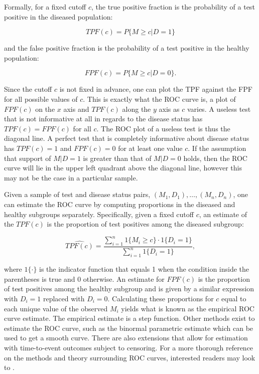 \documentclass[codesnippet]{jss}
\begin{document}
Formally, for a fixed cutoff \(c\), the true positive fraction is the
probability of a test positive in the diseased population:

\[ TPF(c) = P\{ M \geq c | D = 1 \} \]

and the false positive fraction is the probability of a test positive in
the healthy population:

\[ FPF(c) = P\{ M \geq c | D = 0 \}. \]

Since the cutoff \(c\) is not fixed in advance, one can plot the TPF
against the FPF for all possible values of \(c\). This is exactly what
the ROC curve is, a plot of \(FPF(c)\) on the \(x\) axis and \(TPF(c)\)
along the \(y\) axis as \(c\) varies. A useless test that is not
informative at all in regards to the disease status has
\(TPF(c) = FPF(c)\) for all \(c\). The ROC plot of a useless test is
thus the diagonal line. A perfect test that is completely informative
about disease status has \(TPF(c) = 1\) and \(FPF(c) = 0\) for at least
one value \(c\). If the assumption that support of \(M | D = 1\) is
greater than that of \(M | D = 0\) holds, then the ROC curve will lie in
the upper left quadrant above the diagonal line, however this may not be
the case in a particular sample.

Given a sample of test and disease status pairs,
\((M_1, D_1), \ldots, (M_n, D_n)\), one can estimate the ROC curve by
computing proportions in the diseased and healthy subgroups separately.
Specifically, given a fixed cutoff \(c\), an estimate of the \(TPF(c)\)
is the proportion of test positives among the diseased subgroup:

\[ \widehat{TPF(c)} = \frac{\sum_{i = 1}^n 1\{M_i \geq c\} \cdot 1\{D_i = 1\}}{\sum_{i=1}^n 1\{D_i = 1\}}, \]

where \(1\{\cdot\}\) is the indicator function that equals 1 when the
condition inside the parentheses is true and 0 otherwise. An estimate
for \(FPF(c)\) is the proportion of test positives among the healthy
subgroup and is given by a similar expression with \(D_i = 1\) replaced
with \(D_i = 0\). Calculating these proportions for \(c\) equal to each
unique value of the observed \(M_i\) yields what is known as the
empirical ROC curve estimate. The empirical estimate is a step function.
Other methods exist to estimate the ROC curve, such as the binormal
parametric estimate which can be used to get a smooth curve. There are
also extensions that allow for estimation with time-to-event outcomes
subject to censoring. For a more thorough reference on the methods and
theory surrounding ROC curves, interested readers may look to
\citet{pepe2003statistical}.
\end{document}
